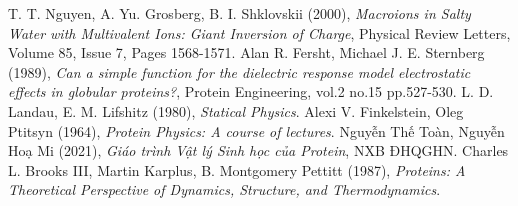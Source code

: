 
\begin{thebibliography}{}
 T. T. Nguyen, A. Yu. Grosberg, B. I. Shklovskii (2000), \textit{Macroions in Salty Water with Multivalent Ions: Giant Inversion of Charge}, Physical Review Letters, Volume 85, Issue 7, Pages 1568-1571.
 Alan R. Fersht, Michael J. E. Sternberg (1989), \textit{Can a simple function for the dielectric response model electrostatic effects in globular proteins?}, Protein Engineering, vol.2 no.15 pp.527-530.
 L. D. Landau, E. M. Lifshitz (1980), \textit{Statical Physics}.
 Alexi V. Finkelstein, Oleg Ptitsyn (1964), \textit{Protein Physics: A course of lectures}.
 Nguyễn Thế Toàn, Nguyễn Hoạ Mi (2021), \textit{Giáo trình Vật lý Sinh học của Protein}, NXB ĐHQGHN.
 Charles L. Brooks III, Martin Karplus, B. Montgomery Pettitt (1987), \textit{Proteins: A Theoretical Perspective of Dynamics, Structure, and Thermodynamics}.
\end{thebibliography}